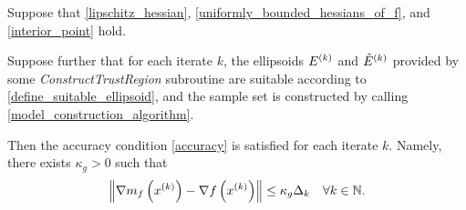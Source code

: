 





%

\begin{theorem}
\label{linear_accuracy_is_satisfied}
Suppose that \cref{lipschitz_hessian}, \cref{uniformly_bounded_hessians_of_f}, and \cref{interior_point} hold.

Suppose further that for each iterate $k$, the ellipsoids ${E^{(k)}}$ and ${{\hat E}^{(k)}}$ provided by some \emph{ConstructTrustRegion} subroutine 
are suitable according to \cref{define_suitable_ellipsoid},
and the sample set is constructed by calling \cref{model_construction_algorithm}.



Then the accuracy condition \cref{accuracy} is satisfied for each iterate $k$.
Namely, there exists $\kappa_{g} > 0$ such that 
\begin{align*}
\left\|\nabla m_f\left(x^{(k)}\right) - \nabla f\left(x^{(k)}\right)\right\| \le \kappa_g \Delta_k \quad \forall k \in \mathbb N.
\end{align*}
\end{theorem}

